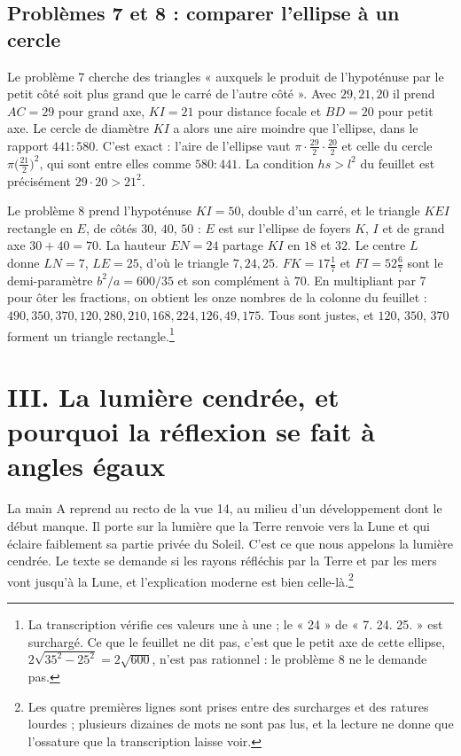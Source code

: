 \documentclass[11pt,a4paper]{article}
\begin{document}
\subsection*{Problèmes 7 et 8 : comparer l'ellipse à un cercle}

Le problème 7 cherche des triangles « auxquels le produit de l'hypoténuse par
le petit côté soit plus grand que le carré de l'autre côté ». Avec \(29,21,20\)
il prend \(AC=29\) pour grand axe, \(KI=21\) pour distance focale et
\(BD=20\) pour petit axe. Le cercle de diamètre \(KI\) a alors une aire moindre
que l'ellipse, dans le rapport \(441:580\). C'est exact : l'aire de l'ellipse
vaut \(\pi\cdot\frac{29}{2}\cdot\frac{20}{2}\) et celle du cercle
\(\pi\bigl(\frac{21}{2}\bigr)^2\), qui sont entre elles comme \(580:441\). La
condition \(hs>l^2\) du feuillet est précisément \(29\cdot20>21^2\).

Le problème 8 prend l'hypoténuse \(KI=50\), double d'un carré, et le triangle
\(KEI\) rectangle en \(E\), de côtés \(30\), \(40\), \(50\) : \(E\) est sur
l'ellipse de foyers \(K\), \(I\) et de grand axe \(30+40=70\). La hauteur
\(EN=24\) partage \(KI\) en \(18\) et \(32\). Le centre \(L\) donne \(LN=7\),
\(LE=25\), d'où le triangle \(7,24,25\). \(FK=17\frac17\) et
\(FI=52\frac67\) sont le demi-paramètre \(b^2/a=600/35\) et son complément à
\(70\). En multipliant par 7 pour ôter les fractions, on obtient les onze
nombres de la colonne du feuillet : \(490, 350, 370, 120, 280, 210, 168, 224,
126, 49, 175\). Tous sont justes, et \(120\), \(350\), \(370\) forment un
triangle rectangle.\footnote{La transcription vérifie ces valeurs une à une ;
le « 24 » de « 7. 24. 25. » est surchargé. Ce que le feuillet ne dit pas, c'est
que le petit axe de cette ellipse, \(2\sqrt{35^2-25^2}=2\sqrt{600}\), n'est pas
rationnel : le problème 8 ne le demande pas.}

\section*{III. La lumière cendrée, et pourquoi la réflexion se fait à angles égaux}

La main A reprend au recto de la vue 14, au milieu d'un développement dont le
début manque. Il porte sur la lumière que la Terre renvoie vers la Lune et qui
éclaire faiblement sa partie privée du Soleil. C'est ce que nous appelons la
lumière cendrée. Le texte se demande si les rayons réfléchis par la Terre et par
les mers vont jusqu'à la Lune, et l'explication moderne est bien
celle-là.\footnote{Les quatre premières lignes sont prises entre des surcharges
et des ratures lourdes ; plusieurs dizaines de mots ne sont pas lus, et la
lecture ne donne que l'ossature que la transcription laisse voir.}
\end{document}
